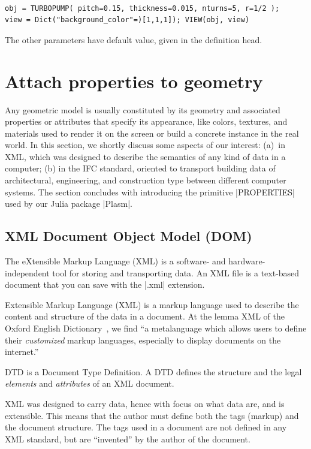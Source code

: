 \begin{coding}
\begin{coding}\ 
\begin{lstlisting}[language=JuliaLocal, style=julia, mathescape=true]
obj = TURBOPUMP( pitch=0.15, thickness=0.015, nturns=5, r=1/2 );
view = Dict("background_color"=)[1,1,1]); VIEW(obj, view)
\end{lstlisting}
The other parameters have default value, given in the definition head.
\end{coding}



\section{Attach properties to geometry}\label{sect:4-4}

Any geometric model is usually constituted by its geometry and associated properties or attributes that specify its appearance, like colors, textures, and materials used to render it on the screen or build a concrete instance in the real world. In this section, we shortly discuss some aspects of our interest: (a)~in XML, which was designed to describe the semantics of any kind of data in a computer; (b)  in the IFC standard, oriented to transport building data of architectural, engineering, and construction type between different computer systems. The section concludes with introducing the primitive |PROPERTIES| used by our Julia package |Plasm|.

\subsection*{XML Document Object Model (DOM)}\label{sect:4-4-1}

The eXtensible Markup Language (XML) is a software- and hardware-independent tool for storing and transporting data. An XML file is a text-based document that you can save with the |.xml| extension. 

Extensible Markup Language (XML) is a markup language used to describe the content and structure of the data in a document.
At the lemma XML of the Oxford English Dictionary~\cite{}, we find “a metalanguage which allows users to define their \emph{customized} markup languages, especially to display documents on the internet.”

\begin{definition} 
DTD is a Document Type Definition. A DTD defines the structure and the legal \emph{elements} and \emph{attributes} of an XML document.
\end{definition}
XML was designed to carry data, hence with focus on what data are, and is extensible. This means that the author must define both the tags (markup) and the document structure.
The tags used in a document are not defined in any XML standard, but are “invented” by the author of the document.


\end{coding}
